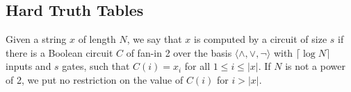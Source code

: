 


\subsection{Hard Truth Tables}
\begin{definition}\label{def:circ-size}
Given a string $x$ of length $N$, we say that $x$ is computed by a circuit of size $s$ if there is a Boolean circuit $C$ of fan-in 2 over the basis $\langle \land, \lor, \lnot \rangle$ with $\lceil \log N \rceil$ inputs and $s$ gates, such that $C(i)=x_i$ for all $1 \leq i \leq |x|$. If $N$ is not a power of 2, we put no restriction on the value of $C(i)$ for $i > |x|$.
\end{definition}

